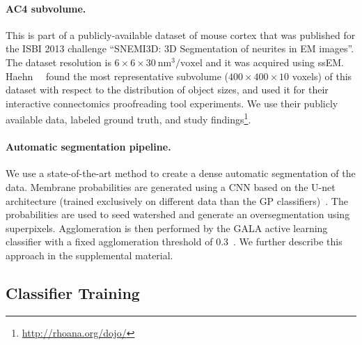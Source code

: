 \paragraph{AC4 subvolume.} This is part of a publicly-available dataset of mouse cortex that was published for the ISBI 2013 challenge ``SNEMI3D: 3D Segmentation of neurites in EM images''. The dataset resolution is $6\times6\times30~\text{nm}^3\text{/voxel}$ and it was acquired using ssEM. Haehn~\etal~\cite{haehn_dojo_2014} found the most representative subvolume ($400\times400\times10$ voxels) of this dataset with respect to the distribution of object sizes, and used it for their interactive connectomics proofreading tool experiments. We use their publicly available data, labeled ground truth, and study findings\footnote{\scriptsize{\url{http://rhoana.org/dojo/}}}.


\paragraph{Automatic segmentation pipeline.}
We use a state-of-the-art method to create a dense automatic segmentation of the data. Membrane probabilities are generated using a CNN based on the U-net architecture (trained exclusively on different data than the GP classifiers)~\cite{RonnebergerFB15}. The probabilities are used to seed watershed and generate an oversegmentation using superpixels. Agglomeration is then performed by the GALA active learning classifier with a fixed agglomeration threshold of 0.3~\cite{nunez2014graph}. We further describe this approach in the supplemental material.

\subsection{Classifier Training}

